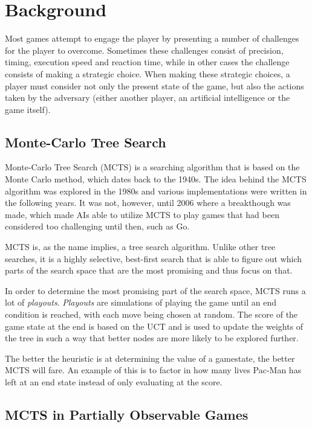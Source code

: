 \section{Background}
\label{02}
Most games attempt to engage the player by presenting a number of challenges for the player to overcome. Sometimes these challenges consist of precision, timing, execution speed and reaction time, while in other cases the challenge consists of making a strategic choice. When making these strategic choices, a player must consider not only the present state of the game, but also the actions taken by the adversary (either another player, an artificial intelligence or the game itself). 

\subsection{Monte-Carlo Tree Search}
\label{02_MCTS}

Monte-Carlo Tree Search (MCTS)\cite{browne2012survey} is a searching algorithm that is based on the Monte Carlo method, which dates back to the 1940s. The idea behind the MCTS algorithm was explored in the 1980s and various implementations were written in the following years. It was not, however, until 2006 where a breakthough was made, which made AIs able to utilize MCTS to play games that had been considered too challenging until then, such as Go\cite{gelly2011monte}\cite{chaslot2010monte}.

MCTS is, as the name implies, a tree search algorithm. Unlike other tree searches, it is a highly selective, best-first search that is able to figure out which parts of the search space that are the most promising and thus focus on that.

In order to determine the most promising part of the search space, MCTS runs a lot of \textit{playouts}. \textit{Playouts} are simulations of playing the game until an end condition is reached, with each move being chosen at random. The score of the game state at the end is based on the UCT and is used to update the weights of the tree in such a way that better nodes are more likely to be explored further.

The better the heuristic is at determining the value of a gamestate, the better MCTS will fare. An example of this is to factor in how many lives Pac-Man has left at an end state instead of only evaluating at the score.


\subsection{MCTS in Partially Observable Games}

